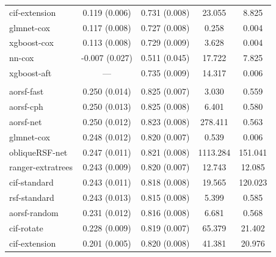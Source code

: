 \documentclass{article}\usepackage[]{graphicx}\usepackage[]{xcolor}
\newenvironment{knitrout}{}{} %
\begin{document}
\begin{knitrout}
\begin{longtable}[t]{lcccc}
\hspace{1em}cif-extension & 0.119 (0.006) & 0.731 (0.008) & 23.055 & 8.825\\
\hspace{1em}glmnet-cox & 0.117 (0.008) & 0.727 (0.008) & 0.258 & 0.004\\
\hspace{1em}xgboost-cox & 0.113 (0.008) & 0.729 (0.009) & 3.628 & 0.004\\
\hspace{1em}nn-cox & -0.007 (0.027) & 0.511 (0.045) & 17.722 & 7.825\\
\hspace{1em}xgboost-aft & --- & 0.735 (0.009) & 14.317 & 0.006\\
\addlinespace[0.3em]
\multicolumn{5}{l}{\textit{\textbf{Serum free light chain; death, n = 7874, p = 10}}}\\
\hline
\hspace{1em}aorsf-fast & 0.250 (0.014) & 0.825 (0.007) & 3.030 & 0.559\\
\hspace{1em}aorsf-cph & 0.250 (0.013) & 0.825 (0.008) & 6.401 & 0.580\\
\hspace{1em}aorsf-net & 0.250 (0.012) & 0.823 (0.008) & 278.411 & 0.563\\
\hspace{1em}glmnet-cox & 0.248 (0.012) & 0.820 (0.007) & 0.539 & 0.006\\
\hspace{1em}obliqueRSF-net & 0.247 (0.011) & 0.821 (0.008) & 1113.284 & 151.041\\
\hspace{1em}ranger-extratrees & 0.243 (0.009) & 0.820 (0.007) & 12.743 & 12.085\\
\hspace{1em}cif-standard & 0.243 (0.011) & 0.818 (0.008) & 19.565 & 120.023\\
\hspace{1em}rsf-standard & 0.243 (0.013) & 0.815 (0.008) & 5.399 & 0.585\\
\hspace{1em}aorsf-random & 0.231 (0.012) & 0.816 (0.008) & 6.681 & 0.568\\
\hspace{1em}cif-rotate & 0.228 (0.009) & 0.819 (0.007) & 65.379 & 21.402\\
\hspace{1em}cif-extension & 0.201 (0.005) & 0.820 (0.008) & 41.381 & 20.976\\

\end{longtable}
\end{knitrout}
\end{document}
